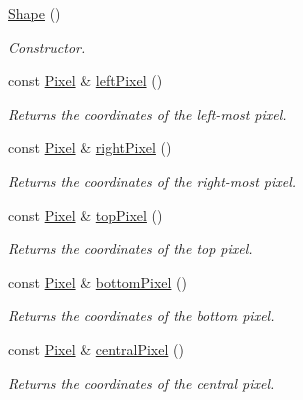 \begin{CompactItemize}
\item 
\hyperlink{class_shape_aa8d87171e65e0d8ba3c5459978992a7}{Shape} ()
\begin{CompactList}\small\item\em Constructor. \item\end{CompactList}\item 
const \hyperlink{_pixel_8hpp_535e59456e3e633842529cfa8ea103c4}{Pixel} \& \hyperlink{class_shape_2459925c87fd67a5fe3baf25f0ff41d3}{leftPixel} ()
\begin{CompactList}\small\item\em Returns the coordinates of the left-most pixel. \item\end{CompactList}\item 
const \hyperlink{_pixel_8hpp_535e59456e3e633842529cfa8ea103c4}{Pixel} \& \hyperlink{class_shape_86841a53f5d82ba696406ef29f908d4f}{rightPixel} ()
\begin{CompactList}\small\item\em Returns the coordinates of the right-most pixel. \item\end{CompactList}\item 
const \hyperlink{_pixel_8hpp_535e59456e3e633842529cfa8ea103c4}{Pixel} \& \hyperlink{class_shape_070525c7002c5f02361a102d0351520e}{topPixel} ()
\begin{CompactList}\small\item\em Returns the coordinates of the top pixel. \item\end{CompactList}\item 
const \hyperlink{_pixel_8hpp_535e59456e3e633842529cfa8ea103c4}{Pixel} \& \hyperlink{class_shape_0454e59e7572927e4a29b40c950bc52f}{bottomPixel} ()
\begin{CompactList}\small\item\em Returns the coordinates of the bottom pixel. \item\end{CompactList}\item 
const \hyperlink{_pixel_8hpp_535e59456e3e633842529cfa8ea103c4}{Pixel} \& \hyperlink{class_shape_cae0adae98c38009c8241ef0baa169c3}{centralPixel} ()
\begin{CompactList}\small\item\em Returns the coordinates of the central pixel. \item\end{CompactList}\item 

\end{CompactItemize}

